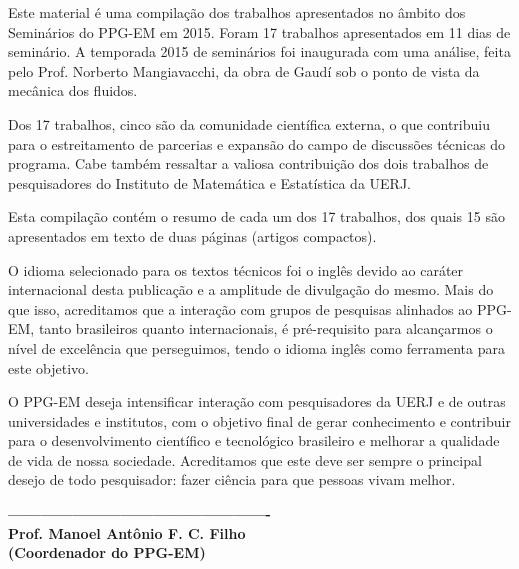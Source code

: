\documentclass[11pt,a4paper]{book} %
\newcommand{\numpaperspt}{15 }
\begin{document}
\vspace*{-28mm}
\hspace*{-12mm}
\begin{minipage}[t]{.55\textwidth}
	Este material é uma compilação dos trabalhos apresentados no âmbito dos Seminários do PPG-EM em 2015. Foram 17 trabalhos apresentados em 11 dias de seminário. A temporada 2015 de seminários foi inaugurada com uma análise, feita pelo Prof. Norberto Mangiavacchi, da obra de Gaudí sob o ponto de vista da mecânica dos fluidos. 
	
	Dos 17 trabalhos, cinco são da comunidade científica externa, o que contribuiu para o estreitamento de parcerias e expansão do campo de discussões técnicas do programa. Cabe também ressaltar a valiosa contribuição dos dois trabalhos de pesquisadores do Instituto de Matemática e Estatística da UERJ.
	
	Esta compilação contém o resumo de cada um dos 17 trabalhos, dos quais \numpaperspt são apresentados em texto de duas páginas (artigos compactos). 
	
	O idioma selecionado para os textos técnicos foi o inglês devido ao caráter internacional desta publicação e a amplitude de divulgação do mesmo. Mais do que isso, acreditamos que a interação com grupos de pesquisas alinhados ao PPG-EM, tanto brasileiros quanto internacionais, é pré-requisito para alcançarmos o nível de excelência que perseguimos, tendo o idioma inglês como ferramenta para este objetivo. 
	
	O PPG-EM deseja intensificar interação com pesquisadores da UERJ e de outras universidades e institutos, com o objetivo final de gerar conhecimento e contribuir para o desenvolvimento científico e tecnológico brasileiro e melhorar a qualidade de vida de nossa sociedade. Acreditamos que este deve ser sempre o principal desejo de todo pesquisador: fazer ciência para que pessoas vivam melhor.
	
	\vspace*{10mm}
	\begin{center}
		\textbf{-------------------------------------------------\\
				Prof. Manoel Antônio F. C. Filho\\
				(Coordenador do PPG-EM)}
	\end{center}
	
\end{minipage}
\hspace*{8mm}
\end{document}
